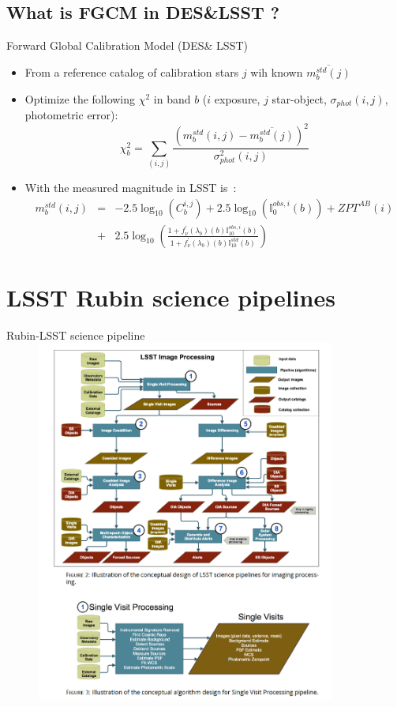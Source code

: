 \documentclass{beamer}
\begin{document}
\subsection{What is FGCM  in DES\&LSST ?}
\begin{frame}{Forward Global Calibration Model {\small (DES\& LSST)}}
\begin{itemize}
\item From a reference catalog of calibration stars $j$ wih known $\overline{m_b^{std}(j)}$
\item Optimize the following $\chi^2$ in band $b$ ($i$ exposure, $j$ star-object, $\sigma_{phot}(i,j)$, photometric error):
\begin{equation} 
\chi^2_b = 
\sum_{(i,j)} \frac{ \left(m_b^{std}(i,j) - \overline{m_b^{std}(j)} \right)^2}{\sigma_{phot}^2(i,j)}
\end{equation}
\item With the measured magnitude in LSST is~:
\begin{eqnarray}
m_b^{std}(i,j) & = & -2.5\log_{10}(C_b^{i,j}) +2.5\log_{10}(\mathbb{I}_0^{obs,i}(b)) +ZPT^{AB}(i)  \nonumber \\
& + & 2.5 \log_{10}\left( \frac{1+f_\nu^{\prime}(\lambda_b)(b)\mathbb{I}_{10}^{obs,i}(b)}{1+f_\nu^{\prime}(\lambda_b)(b)\mathbb{I}_{10}^{std}(b)}\right)
\end{eqnarray}
\end{itemize}
\end{frame}



\section{LSST Rubin science pipelines}
\begin{frame}{Rubin-LSST science pipeline}
\includegraphics[width=12cm, height=12cm]{figs/dm/DMpipelines1.png}
\end{frame}
\end{document}
